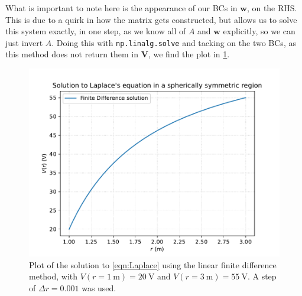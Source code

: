 \documentclass[11pt]{article}
\newcommand{\mb}[1]{\mathbf{#1}}
\begin{document}
\begin{enumerate}
    What is important to note here is the appearance of our BCs in $\mb{w}$, on the RHS. This is due to a quirk in how the matrix gets constructed, but allows us to solve this system exactly, in one step, as we know all of $A$ and $\mb{w}$ explicitly, so we can just invert $A$. Doing this with \texttt{np.linalg.solve} and tacking on the two BCs, as this method does not return them in $\mb{V}$, we find the plot in \cref{fig:LaplaceFD}.

    \begin{figure}[h]
        \begin{center}
            \includegraphics[width=.75\textwidth]{Plots/laplaceFD.pdf}
            \caption{Plot of the solution to \cref{eqn:Laplace} using the linear finite difference method, with $V(r=\SI{1}{\metre})=\SI{20}{\volt}$ and $V(r=\SI{3}{\metre})=\SI{55}{\volt}$. A step of $\Delta r=0.001$ was used. }
            \label{fig:LaplaceFD}
        \end{center}
    \end{figure}

    
    


\end{enumerate}
\end{document}
